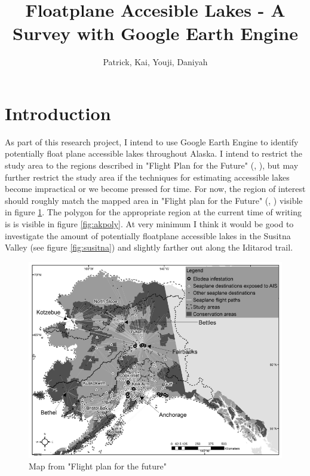 \documentclass[
    ngerman,american
    ]{scrartcl}
\title{
        Floatplane Accesible Lakes - A Survey with Google Earth Engine
        \\  \Large{\paperSubTitle{\lang}}} %
\author{
        Patrick, Kai, Youji, Daniyah
        }
\renewcommand{\cite}[1]{ (\citeauthor{#1}, \citeyear{#1})}
\begin{document}
      \maketitle

        \section{Introduction}
        
            As part of this research project, I intend to use Google Earth Engine to identify potentially float plane accessible lakes throughout Alaska.  I intend to restrict the study area to the regions described in "Flight Plan for the Future" \cite{schwoerer2022flight}, but may further restrict the study area if the techniques for estimating accessible lakes become impractical or we become pressed for time.  For now, the region of interest should roughly match the mapped area in "Flight plan for the Future" \cite{schwoerer2022flight} visible in figure \ref{fig:tobymap}.  The polygon for the appropriate region at the current time of writing is is visible in figure \ref{fig:akpoly}.  At very minimum I think it would be good to investigate the amount of potentially floatplane accessible lakes in the Susitna Valley (see figure \ref{fig:susitna}) and slightly farther out along the Iditarod trail.



            \begin{figure}
                \centering
                \includegraphics[width=0.75\linewidth]{tobymap.png}
                \caption{Map from "Flight plan for the future"}
                \label{fig:tobymap}
            \end{figure}
\end{document}

